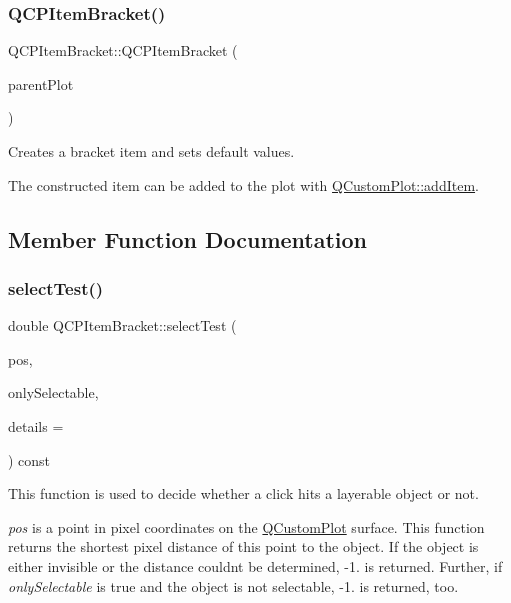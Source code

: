 \subsubsection{\texorpdfstring{Q\+C\+P\+Item\+Bracket()}{QCPItemBracket()}}
{\footnotesize\ttfamily Q\+C\+P\+Item\+Bracket\+::\+Q\+C\+P\+Item\+Bracket (\begin{DoxyParamCaption}\item[{\hyperlink{class_q_custom_plot}{Q\+Custom\+Plot} $\ast$}]{parent\+Plot }\end{DoxyParamCaption})}

Creates a bracket item and sets default values.

The constructed item can be added to the plot with \hyperlink{class_q_custom_plot_aa500620379262321685cb7a7674cbd2a}{Q\+Custom\+Plot\+::add\+Item}. 

\subsection{Member Function Documentation}
\hypertarget{class_q_c_p_item_bracket_a971299aa6fef75730d6f10efdaf48616}{}\label{class_q_c_p_item_bracket_a971299aa6fef75730d6f10efdaf48616} 
\subsubsection{\texorpdfstring{select\+Test()}{selectTest()}}
{\footnotesize\ttfamily double Q\+C\+P\+Item\+Bracket\+::select\+Test (\begin{DoxyParamCaption}\item[{const Q\+PointF \&}]{pos,  }\item[{bool}]{only\+Selectable,  }\item[{Q\+Variant $\ast$}]{details = {} }\end{DoxyParamCaption}) const\hspace{0.3cm}{\ttfamily [virtual]}}

This function is used to decide whether a click hits a layerable object or not.

{\itshape pos} is a point in pixel coordinates on the \hyperlink{class_q_custom_plot}{Q\+Custom\+Plot} surface. This function returns the shortest pixel distance of this point to the object. If the object is either invisible or the distance couldn\textquotesingle{}t be determined, -\/1. is returned. Further, if {\itshape only\+Selectable} is true and the object is not selectable, -\/1. is returned, too.


